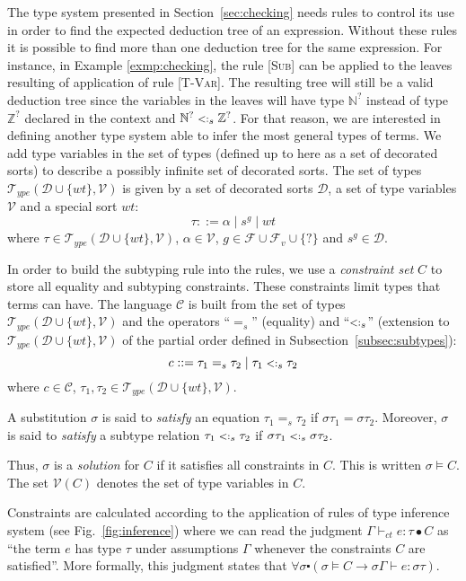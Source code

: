 \documentclass{eptcs}
\newcommand{\TT}{\ensuremath{\mathcal{T}}\xspace}
\newcommand{\VV}{\ensuremath{\mathcal{V}}\xspace}
\newcommand{\caD}{\ensuremath{\mathcal{D}}\xspace}
\newcommand{\caF}{\ensuremath{\mathcal{F}}\xspace}
\newcommand{\caC}{\ensuremath{\mathcal{C}}\xspace}
\newcommand{\CC}{\ensuremath{C}\xspace}
\newcommand{\VC}{\ensuremath{\VV(\CC)}\xspace}
\newcommand{\TYDV}{\ensuremath{\TT_{ype}(\caD \cup \{wt\},\VV)}\xspace}
\newcommand{\NN}{\ensuremath{\mathbb{N}}\xspace}
\newcommand{\ZZ}{\ensuremath{\mathbb{Z}}\xspace}
\newcommand{\TVar}{{\small \textsc{T-Var}}}
\newcommand{\Sub}{{\small \textsc{Sub}}}
\newcommand{\sub}{\mathrel{\mbox{{\footnotesize $<:$}}}}
\newcommand{\wt}[0]{{\ensuremath{wt}}}
\newcommand{\ctvdash}{\ensuremath{\vdash_{ct}}}
\begin{document}
The type system presented in Section~\ref{sec:checking} needs rules to
control its use in order to find the expected deduction tree of an expression. Without these rules it is possible to find more than one
deduction tree for the same expression. For instance, in Example
\ref{exmp:checking}, the rule [\Sub] can be applied to the leaves resulting of application of
rule [\TVar]. The resulting tree will still be a valid deduction tree since the
variables in the leaves will have type $\NN^?$ instead of type $\ZZ^?$
declared in the context and $\NN^? \sub_s \ZZ^?$. For that reason, we are interested in defining another type system
able to infer the most general types of terms. We add type variables in the set
of types (defined up to here as a set of decorated sorts) to describe a
possibly infinite set of decorated sorts. The set of types
$\TYDV$ is given by a set of decorated sorts $\caD$, a set of type variables
$\VV$ and a special sort $\wt$:
$$
\tau ::= \alpha \mid s^g \mid \wt
$$
where $\tau \in \TYDV$, $\alpha \in \VV$, $g \in \caF\cup\caF_v\cup\{?\}$ and $s^g \in \caD$. 

In order to build the subtyping rule into the rules, we use a
{\em constraint set} \CC to store all equality and subtyping constraints. These
constraints limit types that terms can have. The language $\caC$ is built from
the set of types $\TYDV$ and the operators ``$=_s$'' (equality) and
``$\sub_s$'' (extension to $\TYDV$ of the partial order defined in Subsection~\ref{subsec:subtypes}):
$$
c ::= \tau_1 =_s \tau_2 \mid \tau_1 \sub_s \tau_2
$$
where $c \in \caC$, $\tau_1,\tau_2 \in \TYDV$.

A substitution $\sigma$ is said to {\em satisfy} an equation $\tau_1 =_s \tau_2$
if $\sigma\tau_1 = \sigma\tau_2$. Moreover, $\sigma$ is said
to {\em satisfy} a subtype relation $\tau_1 \sub_s \tau_2$ if $\sigma\tau_1
\sub_s \sigma\tau_2$.

Thus, $\sigma$ is a {\em solution} for $\CC$ if
it satisfies all constraints in $\CC$. This is written $\sigma \models \CC$. The set $\VC$ denotes the set of type
variables in $\CC$. 

Constraints are calculated according to the application of rules of
 type inference system (see Fig.~\ref{fig:inference}) where we
can read the judgment $\Gamma \ctvdash e : \tau \bullet \CC$ as ``the term $e$ has type $\tau$
under assumptions $\Gamma$ whenever the constraints \CC are
satisfied''. More formally, this judgment states that $
\forall \sigma \centerdot (\sigma \models \CC \rightarrow \sigma\Gamma \vdash e : \sigma\tau)$.
\end{document}

